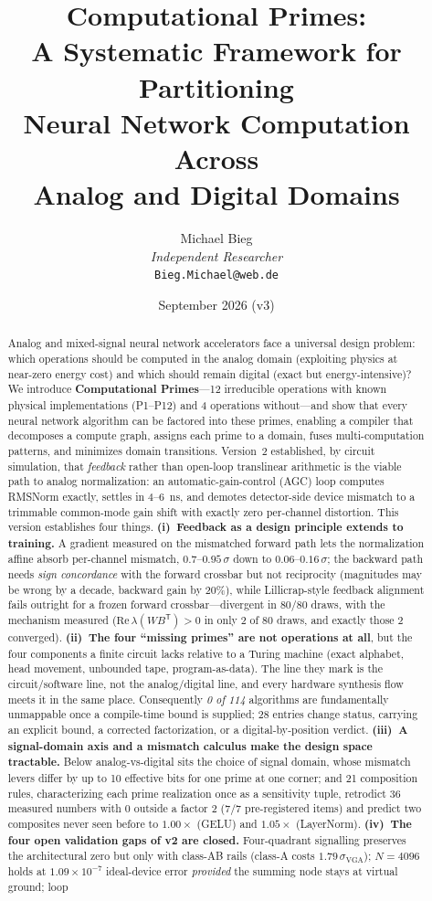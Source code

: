 \documentclass[11pt]{article}
\title{Computational Primes:\\A Systematic Framework for Partitioning\\Neural Network Computation Across\\Analog and Digital Domains}
\author{Michael Bieg\\
\textit{Independent Researcher}\\
\texttt{Bieg.Michael@web.de}}
\date{September 2026 (v3)}
\begin{document}
\maketitle

\begin{abstract}
Analog and mixed-signal neural network accelerators face a universal design problem: which operations should be computed in the analog domain (exploiting physics at near-zero energy cost) and which should remain digital (exact but energy-intensive)? We introduce \textbf{Computational Primes}---12 irreducible operations with known physical implementations (P1--P12) and 4 operations without---and show that every neural network algorithm can be factored into these primes, enabling a compiler that decomposes a compute graph, assigns each prime to a domain, fuses multi-computation patterns, and minimizes domain transitions. Version~2 established, by circuit simulation, that \textit{feedback} rather than open-loop translinear arithmetic is the viable path to analog normalization: an automatic-gain-control (AGC) loop computes RMSNorm exactly, settles in 4--6~ns, and demotes detector-side device mismatch to a trimmable common-mode gain shift with exactly zero per-channel distortion. This version establishes four things. \textbf{(i)~Feedback as a design principle extends to training.} A gradient measured on the mismatched forward path lets the normalization affine absorb per-channel mismatch, $0.7$--$0.95\,\sigma$ down to $0.06$--$0.16\,\sigma$; the backward path needs \textit{sign concordance} with the forward crossbar but not reciprocity (magnitudes may be wrong by a decade, backward gain by 20\%), while Lillicrap-style feedback alignment fails outright for a frozen forward crossbar---divergent in 80/80 draws, with the mechanism measured ($\mathrm{Re}\,\lambda(W B^{\mathsf T})>0$ in only 2 of 80 draws, and exactly those 2 converged). \textbf{(ii)~The four ``missing primes'' are not operations at all}, but the four components a finite circuit lacks relative to a Turing machine (exact alphabet, head movement, unbounded tape, program-as-data). The line they mark is the circuit/software line, not the analog/digital line, and every hardware synthesis flow meets it in the same place. Consequently \textit{0 of 114} algorithms are fundamentally unmappable once a compile-time bound is supplied; 28 entries change status, carrying an explicit bound, a corrected factorization, or a digital-by-position verdict. \textbf{(iii)~A signal-domain axis and a mismatch calculus make the design space tractable.} Below analog-vs-digital sits the choice of signal domain, whose mismatch levers differ by up to 10 effective bits for one prime at one corner; and 21 composition rules, characterizing each prime realization once as a sensitivity tuple, retrodict 36 measured numbers with 0 outside a factor 2 (7/7 pre-registered items) and predict two composites never seen before to $1.00\times$ (GELU) and $1.05\times$ (LayerNorm). \textbf{(iv)~The four open validation gaps of v2 are closed.} Four-quadrant signalling preserves the architectural zero but only with class-AB rails (class-A costs $1.79\,\sigma_{\mathrm{VGA}}$); $N=4096$ holds at $1.09\times10^{-7}$ ideal-device error \textit{provided} the summing node stays at virtual ground; loop 
\end{abstract}
\end{document}
